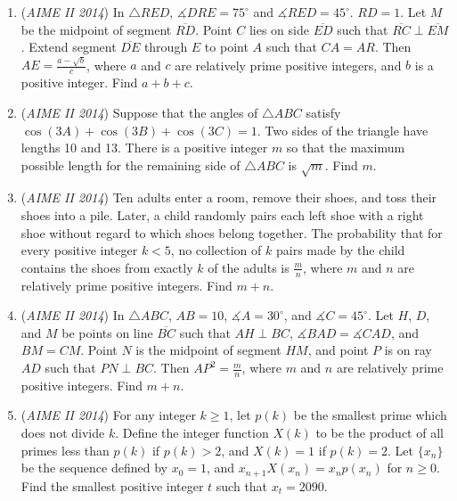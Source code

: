 \begin{enumerate}
 

	\item (\textit{AIME II 2014}) In $\triangle RED$, $\measuredangle DRE=75^{\circ}$ and $\measuredangle RED=45^{\circ}$. $RD=1$. Let $M$ be the midpoint of segment $\overline{RD}$. Point $C$ lies on side $\overline{ED}$ such that $\overline{RC}\perp\overline{EM}$. Extend segment $\overline{DE}$ through $E$ to point $A$ such that $CA=AR$. Then $AE=\frac{a-\sqrt{b}}{c}$, where $a$ and $c$ are relatively prime positive integers, and $b$ is a positive integer. Find $a+b+c$.


 

	\item (\textit{AIME II 2014}) Suppose that the angles of $\triangle ABC$ satisfy $\cos(3A)+\cos(3B)+\cos(3C)=1$. Two sides of the triangle have lengths 10 and 13. There is a positive integer $m$ so that the maximum possible length for the remaining side of $\triangle ABC$ is $\sqrt{m}$. Find $m$. 


 

	\item (\textit{AIME II 2014}) Ten adults enter a room, remove their shoes, and toss their shoes into a pile. Later, a child randomly pairs each left shoe with a right shoe without regard to which shoes belong together. The probability that for every positive integer $k<5$, no collection of $k$ pairs made by the child contains the shoes from exactly $k$ of the adults is $\frac{m}{n}$, where $m$ and $n$ are relatively prime positive integers. Find $m+n$. 


 

	\item (\textit{AIME II 2014}) In $\triangle ABC$, $AB=10$, $\measuredangle A=30^{\circ}$, and $\measuredangle C=45^{\circ}$. Let $H$, $D$, and $M$ be points on line $\overline{BC}$ such that $AH\perp BC$, $\measuredangle BAD=\measuredangle CAD$, and $BM=CM$. Point $N$ is the midpoint of segment $HM$, and point $P$ is on ray $AD$ such that $PN\perp BC$. Then $AP^2=\frac{m}{n}$, where $m$ and $n$ are relatively prime positive integers. Find $m+n$.


 

	\item (\textit{AIME II 2014}) For any integer $k\geq 1$, let $p(k)$ be the smallest prime which does not divide $k$. Define the integer function $X(k)$ to be the product of all primes less than $p(k)$ if $p(k)>2$, and $X(k)=1$ if $p(k)=2$. Let $\{x_n\}$ be the sequence defined by $x_0=1$, and $x_{n+1}X(x_n)=x_np(x_n)$ for $n\geq 0$. Find the smallest positive integer $t$ such that $x_t=2090$. 


 

\end{enumerate}